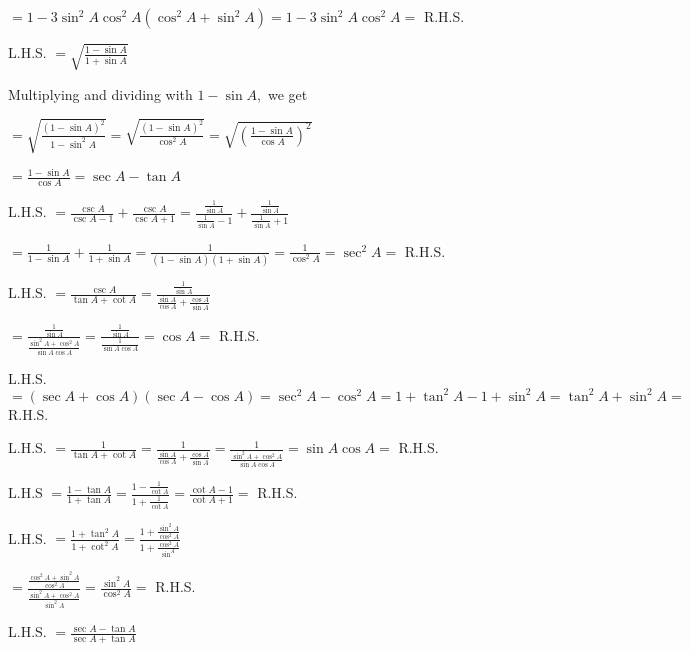    $= 1 - 3\sin^2A\cos^2A(\cos^2A + \sin^2A) = 1 - 3\sin^2A\cos^2A =$ R.H.S.

\item L.H.S. $= \sqrt{\frac{1 - \sin A}{1 + \sin A}}$

   Multiplying and dividing with $1 - \sin A,$ we get

   $= \sqrt{\frac{(1 - \sin A)^2}{1 - \sin^2A}} = \sqrt{\frac{(1 - \sin A)^2}{\cos^2A}} = \sqrt{\left(\frac{1 - \sin A}{\cos
   A}\right)^2}$

   $= \frac{1 - \sin A}{\cos A} = \sec A - \tan A$

\item L.H.S. $= \frac{\csc A}{\csc A - 1} + \frac{\csc A}{\csc A + 1} = \frac{\frac{1}{\sin A}}{\frac{1}{\sin A} - 1} +
   \frac{\frac{1}{\sin A}}{\frac{1}{\sin A} + 1}$

   $= \frac{1}{1 - \sin A} + \frac{1}{1 + \sin A} = \frac{1}{(1 - \sin A)(1 + \sin A)} = \frac{1}{\cos^2A} = \sec^2A =$
   R.H.S.

\item L.H.S. $= \frac{\csc A}{\tan A + \cot A} = \frac{\frac{1}{\sin A}}{\frac{\sin A}{\cos A} + \frac{\cos A}{\sin A}}$

    $= \frac{\frac{1}{\sin A}}{\frac{\sin^2A + \cos^2A}{\sin A\cos A}} = \frac{\frac{1}{\sin A}}{\frac{1}{\sin A\cos A}} =
    \cos A =$ R.H.S.

\item L.H.S. $= (\sec A + \cos A)(\sec A - \cos A) = \sec^2A - \cos^2A = 1 + \tan^2A - 1 + \sin^2A = \tan^2A + \sin^2A =$
    R.H.S.

\item L.H.S. $= \frac{1}{\tan A + \cot A} = \frac{1}{\frac{\sin A}{\cos A} + \frac{\cos A}{\sin A}} = \frac{1}{\frac{\sin^2A +
    \cos^2A}{\sin A\cos A}} = \sin A\cos A =$ R.H.S.

\item L.H.S $= \frac{1 - \tan A}{1 + \tan A} = \frac{1 - \frac{1}{\cot A}}{1 + \frac{1}{\cot A}} = \frac{\cot A - 1}{\cot A +
    1} =$ R.H.S.

\item L.H.S. $= \frac{1 + \tan^2A}{1 + \cot^2A} = \frac{1 + \frac{\sin^2A}{\cos^2A}}{1 + \frac{\cos^2A}{\sin^A}}$

    $= \frac{\frac{\cos^2A + \sin^2A}{\cos^2A}}{\frac{\sin^2A + \cos^2A}{\sin^2A}} = \frac{\sin^2A}{\cos^2A} =$ R.H.S.

\item L.H.S. $= \frac{\sec A - \tan A}{\sec A + \tan A}$

